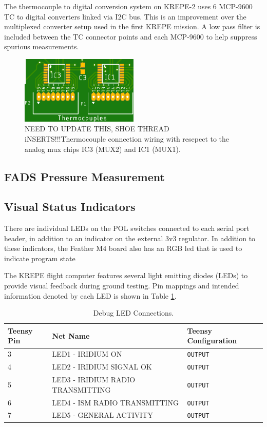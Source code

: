 \documentclass{article}
\begin{document}
The thermocouple to digital conversion system on KREPE-2 uses 6 MCP-9600 TC to digital converters linked via I2C bus. This is an improvement over the multiplexed converter setup used in the first KREPE mission. A low pass filter is included between the TC connector points and each MCP-9600 to help suppress spurious measurements.
%
\begin{figure}[H]
    \centering
    \includegraphics[width=0.5\textwidth]{images/krepe-thermocouples.png}
    \caption{NEED TO UPDATE THIS, SHOE THREAD iNSERTS!!!Thermocouple connection wiring with resepect to the analog mux chips IC3 (MUX2) and IC1 (MUX1).}
    \label{fig:tc-conn}
\end{figure}


\subsection{FADS Pressure Measurement}

\subsection{Visual Status Indicators}
There are individual LEDs on the POL switches connected to each serial port header, in addition to an indicator on the external 3v3 regulator. In addition to these indicators, the Feather M4 board also has an RGB led that is used to indicate program state


The KREPE flight computer features several light emitting diodes (LEDs) to provide visual feedback during ground testing. Pin mappings and intended information denoted by each LED is shown in Table \ref{tab:pins_leds}.
\begin{table}[H]
	\centering
	\caption{Debug LED Connections.}
	\label{tab:pins_leds}
	\begin{tabular}{l|l|l}
		Teensy Pin & Net Name     & Teensy Configuration \\
		\hline 
		3 & LED1 - IRIDIUM ON        &   \texttt{OUTPUT}\\
		4 & LED2 - IRIDIUM SIGNAL OK       &   \texttt{OUTPUT}\\
		5 & LED3 - IRIDIUM RADIO TRANSMITTING       &   \texttt{OUTPUT}\\
		6 & LED4 - ISM RADIO TRANSMITTING       &   \texttt{OUTPUT}\\
		7 & LED5 - GENERAL ACTIVITY       &   \texttt{OUTPUT}
	\end{tabular}
\end{table}
\end{document}
